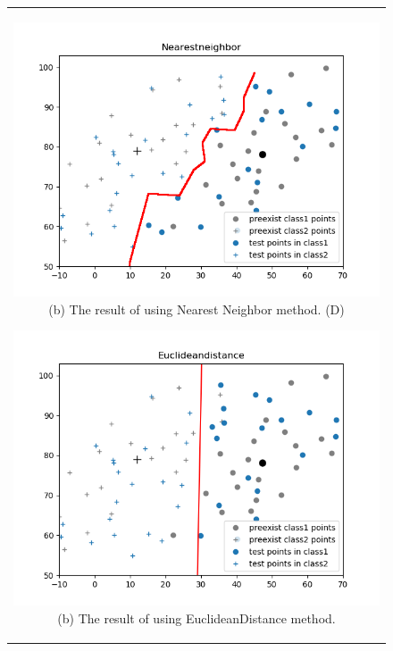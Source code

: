 \documentclass[10.5pt]{jsarticle}
\begin{document}
 \begin{figure}[htbp]
   \centering
   \begin{tabular}{c}
   	\begin{minipage}{0.56\hsize}
   	\centering
   		\includegraphics[width=15.0cm, bb=9 9 700 270]{results/NearestneighborResultFigureD.png}
   		\hspace{0cm} (b) The result of using Nearest Neighbor method. (D)
   	\end{minipage}

   	\begin{minipage}{0.5\hsize}
   	\centering
   		\includegraphics[width=15.0cm, bb=9 9 700 270]{results/EuclideandistanceResultFigureD.png}
   		\hspace{0cm} (b) The result of using EuclideanDistance method.
   	\end{minipage}
   \end{tabular}
 \end{figure}
\end{document}

